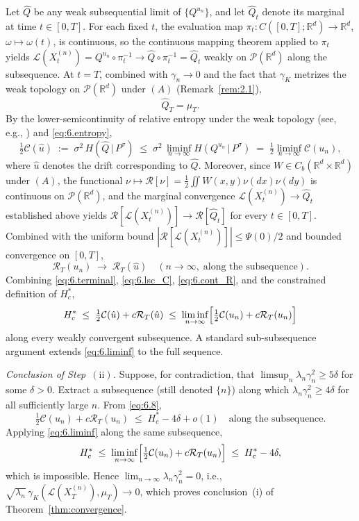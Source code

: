 \documentclass[11pt,leqno]{article}
\theoremstyle{plain}
\theoremstyle{remark}
\theoremstyle{definition}
\numberwithin{equation}{section}
\numberwithin{figure}{section}
\numberwithin{table}{section}
\numberwithin{algorithm}{section}
\newcommand{\RR}{\mathbb{R}}
\newcommand{\cP}{\mathcal{P}}
\begin{document}
Let $\hat Q$ be any weak subsequential limit of $\{Q^{u_n}\}$,
and let $\hat Q_t$ denote its marginal at time $t\in[0,T]$.
For each fixed $t$, the evaluation map
$\pi_t:C([0,T];\RR^d)\to\RR^d$, $\omega\mapsto\omega(t)$,
is continuous, so the continuous mapping theorem
\cite[Theorem~2.7]{bil:1999} applied to $\pi_t$
yields $\mathcal{L}(X_t^{(n)})=Q^{u_n}\circ\pi_t^{-1}\to\hat Q\circ\pi_t^{-1}=\hat Q_t$ weakly on $\cP(\RR^d)$
along the subsequence.
At $t=T$, combined with $\gamma_n\to 0$ and the fact that $\gamma_K$ metrizes the weak topology on $\cP(\RR^d)$ under $(A)$ (Remark~\ref{rem:2.1}),
\begin{equation}\label{eq:6.terminal}
 \hat Q_T = \mu_T.
\end{equation}
By the lower-semicontinuity of relative entropy under the weak topology
(see, e.g., \cite[Lemma~1.4.3]{dup-ell:1997}) and \eqref{eq:6.entropy},
\begin{equation}\label{eq:6.lsc_C}
 \tfrac{1}{2}\mathcal{C}(\hat u)\;:=\;\sigma^2\,H(\hat Q\,|\,P^\sigma)
 \;\le\;\sigma^2\,\liminf_{n\to\infty}H(Q^{u_n}\,|\,P^\sigma)
 \;=\;\tfrac{1}{2}\liminf_{n\to\infty}\mathcal{C}(u_n),
\end{equation}
where $\hat u$ denotes the drift corresponding to $\hat Q$.
Moreover, since $W\in C_b(\RR^d\times\RR^d)$ under $(A)$,
the functional $\nu\mapsto\mathcal{R}[\nu]=\frac{1}{2}\iint W(x,y)\nu(dx)\nu(dy)$ is continuous on $\cP(\RR^d)$,
and the marginal convergence $\mathcal{L}(X_t^{(n)})\to\hat Q_t$ established above yields
$\mathcal{R}[\mathcal{L}(X_t^{(n)})]\to\mathcal{R}[\hat Q_t]$ for every $t\in[0,T]$.
Combined with the uniform bound $|\mathcal{R}[\mathcal{L}(X_t^{(n)})]|\le\Psi(0)/2$
and bounded convergence on $[0,T]$,
\begin{equation}\label{eq:6.cont_R}
 \mathcal{R}_T(u_n)\;\xrightarrow{}\;\mathcal{R}_T(\hat u)\quad(n\to\infty,\;\text{along the subsequence}).
\end{equation}
Combining \eqref{eq:6.terminal}, \eqref{eq:6.lsc_C}, \eqref{eq:6.cont_R}, and the constrained definition of $H^*_c$,
\begin{equation}\label{eq:6.liminf}
 H^*_c\;\le\;\tfrac{1}{2}\mathcal{C}(\hat u)+c\mathcal{R}_T(\hat u)
 \;\le\;\liminf_{n\to\infty}\Bigl[\tfrac{1}{2}\mathcal{C}(u_n)+c\mathcal{R}_T(u_n)\Bigr]
\end{equation}
along every weakly convergent subsequence.
A standard sub-subsequence argument extends \eqref{eq:6.liminf} to the full sequence.

\medskip
\emph{Conclusion of Step~$(\mathrm{ii})$.}
Suppose, for contradiction, that $\limsup_n\lambda_n\gamma_n^2\ge 5\delta$ for some $\delta>0$.
Extract a subsequence (still denoted $\{n\}$) along which $\lambda_n\gamma_n^2\ge 4\delta$ for all sufficiently large $n$.
From \eqref{eq:6.8},
\[
 \tfrac{1}{2}\mathcal{C}(u_n)+c\mathcal{R}_T(u_n)\;\le\;H^*_c-4\delta+o(1)\quad\text{along the subsequence}.
\]
Applying \eqref{eq:6.liminf} along the same subsequence,
\[
 H^*_c\;\le\;\liminf_{n\to\infty}\Bigl[\tfrac{1}{2}\mathcal{C}(u_n)+c\mathcal{R}_T(u_n)\Bigr]\;\le\;H^*_c-4\delta,
\]
which is impossible.
Hence $\lim_{n\to\infty}\lambda_n\gamma_n^2=0$,
i.e., $\sqrt{\lambda_n}\,\gamma_K(\mathcal{L}(X_T^{(n)}),\mu_T)\to 0$,
which proves conclusion~(i) of Theorem~\ref{thm:convergence}.
\end{document}

